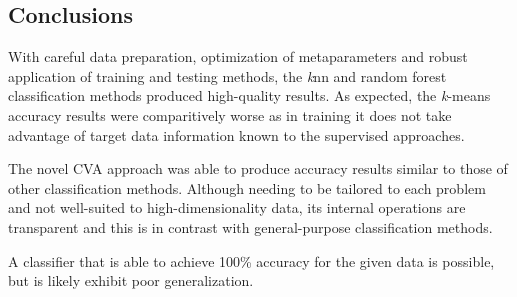 \documentclass[12pt]{article}
\begin{document}
\subsection*{Conclusions}

With careful data preparation, optimization of metaparameters and robust application of training and testing methods, 
the \textit{k}nn and random forest classification methods produced high-quality results. 
As expected, the \textit{k}-means accuracy results were comparitively worse
as in training it does not take advantage of target data information known to the supervised approaches. 

The novel CVA approach was able to produce accuracy results
similar to those of other classification methods. 
Although needing to be tailored to each problem and not well-suited to high-dimensionality data, 
its internal operations are transparent and this is in contrast with general-purpose classification methods. 

A classifier that is able to achieve 100\% accuracy for the given data is possible, 
but is likely exhibit poor generalization.

\printbibliography
\end{document}
